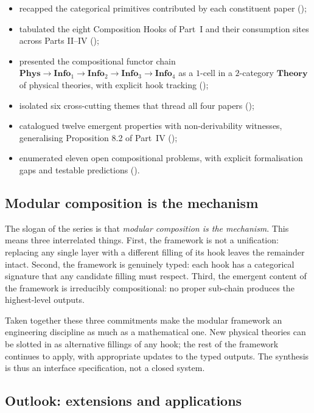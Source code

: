 \documentclass[12pt]{article}
\theoremstyle{definition}
\theoremstyle{remark}
\newcommand{\Phys}{\mathbf{Phys}}
\newcommand{\Info}{\mathbf{Info}}
\newcommand{\Theory}{\mathbf{Theory}}
\begin{document}
\begin{itemize}[leftmargin=2em]
\item recapped the categorical primitives contributed by each constituent
  paper ();
\item tabulated the eight Composition Hooks of Part~I and their
  consumption sites across Parts II--IV ();
\item presented the compositional functor chain $\Phys \to \Info_1 \to
  \Info_2 \to \Info_3 \to \Info_4$ as a $1$-cell in a $2$-category
  $\Theory$ of physical theories, with explicit hook tracking
  ();
\item isolated six cross-cutting themes that thread all four papers
  ();
\item catalogued twelve emergent properties with non-derivability
  witnesses, generalising Proposition 8.2 of Part~IV
  ();
\item enumerated eleven open compositional problems, with explicit
  formalisation gaps and testable predictions ().
\end{itemize}

\subsection{Modular composition is the mechanism}

The slogan of the series is that \emph{modular composition is the mechanism}.
This means three interrelated things. First, the framework is not a
unification: replacing any single layer with a different filling of its hook
leaves the remainder intact. Second, the framework is genuinely typed: each
hook has a categorical signature that any candidate filling must respect.
Third, the emergent content of the framework is irreducibly compositional:
no proper sub-chain produces the highest-level outputs.

Taken together these three commitments make the modular framework an
engineering discipline as much as a mathematical one. New physical theories
can be slotted in as alternative fillings of any hook; the rest of the
framework continues to apply, with appropriate updates to the typed outputs.
The synthesis is thus an interface specification, not a closed system.

\subsection{Outlook: extensions and applications}
\end{document}
